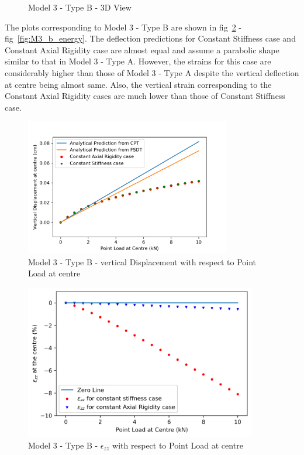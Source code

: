 \begin{figure}[!htbp]
\begin{minipage}{0.3\textwidth}
    \caption{Model 3 - Type B - 3D View}
    \label{fig:M3_b_3D}
\end{minipage}
\end{figure}

The plots corresponding to Model 3 - Type B are shown in fig~\ref{fig:M3_b_plt} - fig~\ref{fig:M3_b_energy}. The deflection predictions for Constant Stiffness case and Constant Axial Rigidity case are almost equal and assume a parabolic shape similar to that in Model 3 - Type A. However, the strains for this case are considerably higher than those of Model 3 - Type A despite the vertical deflection at centre being almost same. Also, the vertical strain corresponding to the Constant Axial Rigidity cases are much lower than those of Constant Stiffness case.

\begin{figure}[!htbp]
    \centering
    \includegraphics[width = 0.8\textwidth]{Figures/M3_b_plt.png}
    \caption{Model 3 - Type B - vertical Displacement with respect to Point Load at centre}
    \label{fig:M3_b_plt}
\end{figure}

\begin{figure}[!htbp]
    \centering
    \includegraphics[width = 0.9\textwidth]{Figures/M3_b_strain.png}
    \caption{Model 3 - Type B - $\epsilon_{zz}$ with respect to Point Load at centre}
    \label{fig:M3_b_strain_plt}
\end{figure}

